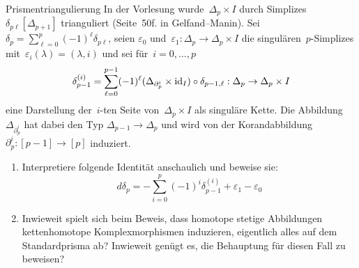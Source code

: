 \documentclass{uebblatt}
\begin{document}

\begin{aufgabe}{Prismentriangulierung}
In der Vorlesung wurde~$\Delta_p \times I$ durch
Simplizes~$\delta_{p\ell}[\Delta_{p+1}]$ trianguliert (Seite~50f. in
Gelfand--Manin). Sei~$\delta_p = \sum_{\ell=0}^p
(-1)^\ell \delta_{p\ell}$, seien $\varepsilon_0$ und~$\varepsilon_1 : \Delta_p \to
\Delta_p \times I$ die singulären~$p$-Simplizes
mit~$\varepsilon_i(\lambda) = (\lambda,i)$ und sei für~$i = 0,\ldots,p$
\[ \delta^{(i)}_{p-1} = \sum_{\ell = 0}^{p-1} (-1)^\ell
  (\Delta_{\partial^i_p} \times \mathrm{id}_I) \circ \delta_{p-1,\ell} :
  \Delta_p \to \Delta_p \times I \]
eine Darstellung der~$i$-ten Seite von~$\Delta_p \times I$ als singuläre Kette.
Die Abbildung $\Delta_{\partial^i_p}$ hat dabei den Typ $\Delta_{p-1} \to
\Delta_p$ und wird von der Korandabbildung~$\partial^i_p : [p-1] \to [p]$ induziert.

\begin{enumerate}
\item Interpretiere folgende Identität anschaulich und beweise sie:
\[ d \delta_p = -\sum_{i=0}^p (-1)^i \delta_{p-1}^{(i)} + \varepsilon_1 -
\varepsilon_0 \]

\item Inwieweit spielt sich beim Beweis, dass homotope stetige Abbildungen
kettenhomotope Komplexmorphismen induzieren, eigentlich alles auf dem
Standardprisma ab? Inwieweit genügt es, die Behauptung für diesen Fall zu
beweisen?
\end{enumerate}
\end{aufgabe}
\end{document}
